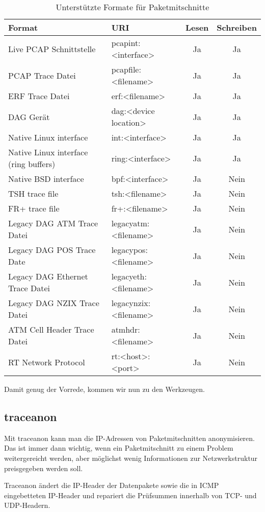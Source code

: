 \begin{normaltext}
  \begin{table}
    \begin{tabularx}{\textwidth}{X | l | c | c}
    Format & URI & Lesen & Schreiben \\
    \hline
    Live PCAP Schnittstelle & pcapint:<interface> & Ja & Ja \\
    PCAP Trace Datei & pcapfile:<filename> & Ja & Ja \\
    ERF Trace Datei & erf:<filename> & Ja & Ja \\
    DAG Gerät & dag:<device location> & Ja & Ja \\
    Native Linux interface & int:<interface> & Ja & Ja \\
    Native Linux interface (ring buffers) & ring:<interface> & Ja & Ja \\
    Native BSD interface & bpf:<interface> & Ja & Nein \\
    TSH trace file & tsh:<filename> & Ja & Nein \\
    FR+ trace file & fr+:<filename> & Ja & Nein \\
    Legacy DAG ATM Trace Datei & legacyatm:<filename> & Ja & Nein \\
    Legacy DAG POS Trace Date & legacypos:<filename> & Ja & Nein \\
    Legacy DAG Ethernet Trace Datei & legacyeth:<filename> & Ja & Nein \\
    Legacy DAG NZIX Trace Datei & legacynzix:<filename> & Ja & Nein \\
    ATM Cell Header Trace Datei & atmhdr:<filename> & Ja & Nein \\
    RT Network Protocol & rt:<host>:<port> & Ja & Nein \\
    \end{tabularx}
    \caption{Unterstützte Formate für Paketmitschnitte}
  \end{table}

  Damit genug der Vorrede, kommen wir nun zu den Werkzeugen.

  \subsection*{traceanon}
  Mit traceanon kann man die IP-Adressen von Paketmitschnitten anonymisieren.
  Das ist immer dann wichtig, wenn ein Paketmitschnitt zu einem Problem
  weitergereicht werden, aber möglichst wenig Informationen zur
  Netzwerkstruktur preisgegeben werden soll.

  Traceanon ändert die IP-Header der Datenpakete sowie die in ICMP
  eingebetteten IP-Header und repariert die Prüfsummen innerhalb von TCP- und
  UDP-Headern.


\end{normaltext}
